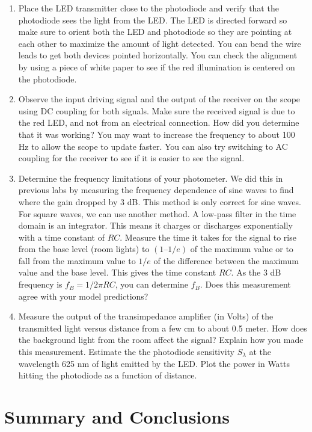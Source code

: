 \documentclass[10pt]{PhysLab1C} %
\begin{document}
\begin{enumerate}
    \item 
    Place the LED transmitter close to the photodiode and verify that the photodiode sees
the light from the LED. The LED is directed forward so make sure to orient both the LED
and photodiode so they are pointing at each other to maximize the amount of light
detected. You can bend the wire leads to get both devices pointed horizontally. You
can check the alignment by using a piece of white paper to see if the red illumination is
centered on the photodiode.
    \item
    Observe the input driving signal and the output of the receiver on the scope using DC
coupling for both signals. Make sure the received signal is due to the red LED, and not
from an electrical connection. How did you determine that it was working? You may
want to increase the frequency to about 100 Hz to allow the scope to update faster. You can
also try switching to AC coupling for the receiver to see if it is easier to see the signal.
    \item
    Determine the frequency limitations of your photometer. We did this in previous labs
by measuring the frequency dependence of sine waves to find where the gain dropped
by 3 dB. This method is only correct for sine waves. For square waves, we can use
another method. A low-pass filter in the time domain is an integrator. This means it
charges or discharges exponentially with a time constant of $RC$. Measure the time it
takes for the signal to rise from the base level (room lights) to $(1–1/e)$ of the maximum
value or to fall from the maximum value to $1/e$ of the difference between the maximum
value and the base level. This gives the time constant $RC$. As the 3 dB frequency is $f_B =1/2\pi RC$, you can determine $f_B$. Does this measurement agree with your model
predictions?
    \item
    Measure the output of the transimpedance amplifier (in Volts) of the transmitted light
versus distance from a few cm to about 0.5 meter. How does the background light from
the room affect the signal? Explain how you made this measurement. Estimate the
the photodiode sensitivity $S_{\lambda}$ at the wavelength 625 nm of light emitted by the LED. Plot
the power in Watts hitting the photodiode as a function of distance.
\end{enumerate}


\section{Summary and Conclusions}
\end{document}
